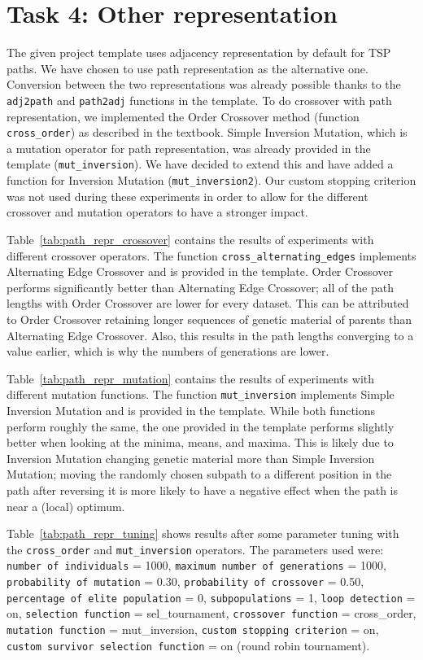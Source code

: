 \documentclass{report}
\begin{document}
\section{Task 4: Other representation}
The given project template uses adjacency representation by default for TSP paths. We have chosen to use path representation as the alternative one. Conversion between the two representations was already possible thanks to the \texttt{adj2path} and \texttt{path2adj} functions in the template. To do crossover with path representation, we implemented the Order Crossover method (function \texttt{cross\_order}) as described in the textbook. Simple Inversion Mutation, which is a mutation operator for path representation, was already provided in the template (\texttt{mut\_inversion}). We have decided to extend this and have added a function for Inversion Mutation (\texttt{mut\_inversion2}). Our custom stopping criterion was not used during these experiments in order to allow for the different crossover and mutation operators to have a stronger impact.

Table~\ref{tab:path_repr_crossover} contains the results of experiments with different crossover operators. The function \texttt{cross\_alternating\_edges} implements Alternating Edge Crossover and is provided in the template. Order Crossover performs significantly better than Alternating Edge Crossover; all of the path lengths with Order Crossover are lower for every dataset. This can be attributed to Order Crossover retaining longer sequences of genetic material of parents than Alternating Edge Crossover. Also, this results in the path lengths converging to a value earlier, which is why the numbers of generations are lower. 


Table~\ref{tab:path_repr_mutation} contains the results of experiments with different mutation functions. The function \texttt{mut\_inversion} implements Simple Inversion Mutation and is provided in the template. While both functions perform roughly the same, the one provided in the template performs slightly better when looking at the minima, means, and maxima. This is likely due to Inversion Mutation changing genetic material more than Simple Inversion Mutation; moving the randomly chosen subpath to a different position in the path after reversing it is more likely to have a negative effect when the path is near a (local) optimum. 


Table~\ref{tab:path_repr_tuning} shows results after some parameter tuning with the \texttt{cross\_order} and \texttt{mut\_inversion} operators. The parameters used were: \texttt{number of individuals} = 1000, \texttt{maximum number of generations} = 1000, \texttt{probability of mutation} = 0.30, \texttt{probability of crossover} = 0.50, \texttt{percentage of elite population} = 0, \texttt{subpopulations} = 1, \texttt{loop detection} = on, \texttt{selection function} = sel\_tournament, \texttt{crossover function} = cross\_order, \texttt{mutation function} = mut\_inversion, \texttt{custom stopping criterion} = on, \texttt{custom survivor selection function} = on (round robin tournament).

\end{document}
